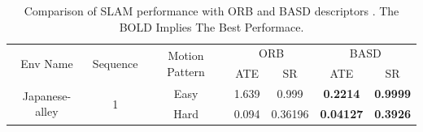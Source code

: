 \documentclass[conference]{IEEEtran}
\begin{document}

\begin{table}[h]
\centering
\scriptsize
\caption{Comparison of SLAM performance with ORB and BASD descriptors . The BOLD Implies The Best Performace.}
\label{table_example}
\begin{center}
\begin{tabular}{ccccccc}
\toprule
\midrule
\multirow{2}{*}{Env Name} & \multirow{2}{*}{Sequence}  &\multirow{2}{*}{Motion Pattern} & \multicolumn{2}{c}{ORB} & \multicolumn{2}{c}{BASD}     \\%
  \cline{4-7}%
                                                      & \multicolumn{1}{c}{} & \multicolumn{1}{c}{}    & \multicolumn{1}{c}{ATE} & \multicolumn{1}{c}{SR} & \multicolumn{1}{c}{ATE}  & \multicolumn{1}{c}{SR}\\
  \cline{1-7}

\multirow{8}{*}{Japanese-alley}   &  \multirow{2}{*}{1}   &  \multicolumn{1}{c}{Easy}  & \multicolumn{1}{c}{1.639} & \multicolumn{1}{c}{0.999} & \multicolumn{1}{c}{\textbf{0.2214}}  & \multicolumn{1}{c}{\textbf{0.9999}}   \\
  \cline{3-7}

                                                         & \multicolumn{1}{c}{}  &  \multicolumn{1}{c}{Hard}  & \multicolumn{1}{c}{0.094} & \multicolumn{1}{c}{0.36196} & \multicolumn{1}{c}{\textbf{0.04127} } & \multicolumn{1}{c}{\textbf{0.3926}}   \\
  \cline{2-7}


\end{tabular}
\end{center}
\end{table}
\end{document}
